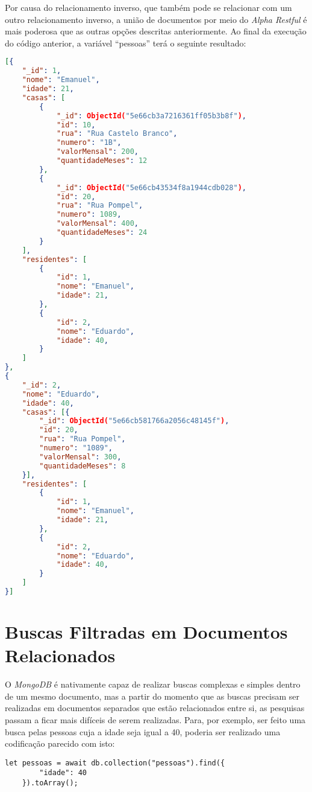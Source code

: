 Por causa do relacionamento inverso, que também pode se relacionar com um outro relacionamento inverso, a união de documentos por meio do \textit{Alpha Restful} é mais poderosa que as outras opções descritas anteriormente. Ao final da execução do código anterior, a variável ``pessoas'' terá o seguinte resultado:

\begin{lstlisting}[language=json, caption={Junção de Documentos Com Residentes}]
[{
    "_id": 1,
    "nome": "Emanuel",
    "idade": 21,
    "casas": [
        {
            "_id": ObjectId("5e66cb3a7216361ff05b3b8f"),
            "id": 10,
            "rua": "Rua Castelo Branco",
            "numero": "1B",
            "valorMensal": 200,
            "quantidadeMeses": 12
        },
        {
            "_id": ObjectId("5e66cb43534f8a1944cdb028"),
            "id": 20,
            "rua": "Rua Pompel",
            "numero": 1089,
            "valorMensal": 400,
            "quantidadeMeses": 24
        }
    ],
    "residentes": [
        {
            "id": 1,
            "nome": "Emanuel",
            "idade": 21,
        },
        {
            "id": 2,
            "nome": "Eduardo",
            "idade": 40,
        }
    ]
},
{
    "_id": 2,
    "nome": "Eduardo",
    "idade": 40,
    "casas": [{
        "_id": ObjectId("5e66cb581766a2056c48145f"),
        "id": 20,
        "rua": "Rua Pompel",
        "numero": "1089",
        "valorMensal": 300,
        "quantidadeMeses": 8
    }],
    "residentes": [
        {
            "id": 1,
            "nome": "Emanuel",
            "idade": 21,
        },
        {
            "id": 2,
            "nome": "Eduardo",
            "idade": 40,
        }
    ]
}]
\end{lstlisting}

\section{Buscas Filtradas em Documentos Relacionados}

O \textit{MongoDB} é nativamente capaz de realizar buscas complexas e simples dentro de um mesmo documento, mas a partir do momento que as buscas precisam ser realizadas em documentos separados que estão relacionados entre si, as pesquisas passam a ficar mais difíceis de serem realizadas. Para, por exemplo, ser feito uma busca pelas pessoas cuja a idade seja igual a 40, poderia ser realizado uma codificação parecido com isto:

\begin{lstlisting}[style=ES6, caption={Busca de Pessoas com idade igual a 40}]
    let pessoas = await db.collection("pessoas").find({
        "idade": 40
    }).toArray();
\end{lstlisting}


